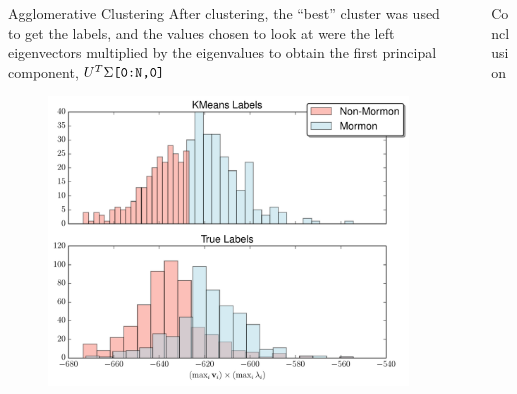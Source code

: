 \documentclass[final]{beamer}
\newlength{\sepwid}
\newlength{\onecolwid}
\begin{document}
\begin{frame}[t]
\begin{columns}[t]
\begin{column}{\onecolwid}
\begin{block}{Agglomerative Clustering}
After clustering, the ``best'' cluster was used to get the labels, and the values chosen to 
look at were the left eigenvectors multiplied by the eigenvalues to obtain the first principal 
component, $U^{T}\Sigma\text{\tt{[0:N,0]}}$


\begin{figure}
\centering
  \includegraphics[width=.75\linewidth]{../data/eigennorm.pdf}
  \label{fig:eigennorm}
\end{figure}


\end{block}



\end{column} %


\begin{column}{\sepwid}\end{column} %

\begin{column}{\onecolwid} %


\begin{block}{Conclusion}


\end{block}
\end{column}
\end{columns}
\end{frame}
\end{document}
